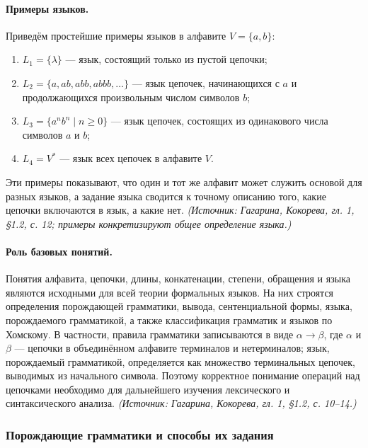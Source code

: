 \documentclass[a4paper,12pt]{article}
\begin{document}
\paragraph{Примеры языков.}
Приведём простейшие примеры языков в алфавите \(V=\{a,b\}\):
\begin{enumerate}[label=\arabic*)]
\item \(L_1=\{\lambda\}\) — язык, состоящий только из пустой цепочки;
\item \(L_2=\{a,ab,abb,abbb,\ldots\}\) — язык цепочек, начинающихся с \(a\) и продолжающихся произвольным числом символов \(b\);
\item \(L_3=\{a^n b^n\mid n\ge 0\}\) — язык цепочек, состоящих из одинакового числа символов \(a\) и \(b\);
\item \(L_4=V^*\) — язык всех цепочек в алфавите \(V\).
\end{enumerate}
Эти примеры показывают, что один и тот же алфавит может служить основой для разных языков, а задание языка сводится к точному описанию того, какие цепочки включаются в язык, а какие нет.
\textit{(Источник: Гагарина, Кокорева, гл. 1, §1.2, с. 12; примеры конкретизируют общее определение языка.)}

\paragraph{Роль базовых понятий.}
Понятия алфавита, цепочки, длины, конкатенации, степени, обращения и языка являются исходными для всей теории формальных языков. На них строятся определения порождающей грамматики, вывода, сентенциальной формы, языка, порождаемого грамматикой, а также классификация грамматик и языков по Хомскому. В частности, правила грамматики записываются в виде \(\alpha\to\beta\), где \(\alpha\) и \(\beta\) — цепочки в объединённом алфавите терминалов и нетерминалов; язык, порождаемый грамматикой, определяется как множество терминальных цепочек, выводимых из начального символа. Поэтому корректное понимание операций над цепочками необходимо для дальнейшего изучения лексического и синтаксического анализа.
\textit{(Источник: Гагарина, Кокорева, гл. 1, §1.2, с. 10--14.)}

\subsubsection{Порождающие грамматики и способы их задания}
\end{document}
